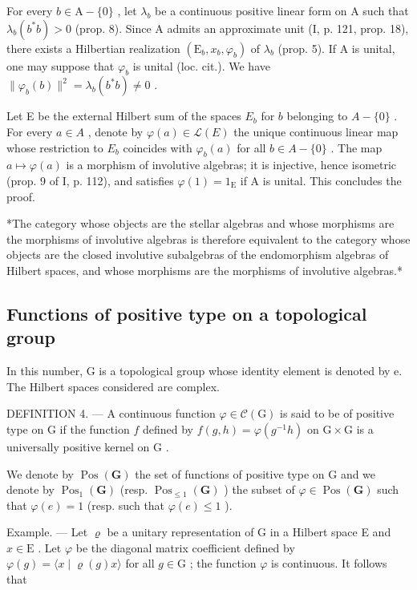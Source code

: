 For every \(b \in \mathrm{A} - \{0\}\) , let \(\lambda_b\) be a continuous positive linear form on A such that \(\lambda_b(b^*b) > 0\) (prop. 8). Since A admits an approximate unit (I, p. 121, prop. 18), there exists a Hilbertian realization \((\mathrm{E}_b, x_b, \varphi_b)\) of \(\lambda_b\) (prop. 5). If A is unital, one may suppose that \(\varphi_b\) is unital (loc. cit.). We have \(\| \varphi_b(b) \|^2 = \lambda_b(b^*b) \neq 0\) .

Let E be the external Hilbert sum of the spaces \(E_{b}\) for \(b\) belonging to \(A - \{0\}\) . For every \(a \in A\) , denote by \(\varphi(a) \in \mathcal{L}(E)\) the unique continuous linear map whose restriction to \(E_{b}\) coincides with \(\varphi_{b}(a)\) for all \(b \in A - \{0\}\) . The map \(a \mapsto \varphi(a)\) is a morphism of involutive algebras; it is injective, hence isometric (prop. 9 of I, p. 112), and satisfies \(\varphi(1) = 1_{\mathrm{E}}\) if A is unital. This concludes the proof.

*The category whose objects are the stellar algebras and whose morphisms are the morphisms of involutive algebras is therefore equivalent to the category whose objects are the closed involutive subalgebras of the endomorphism algebras of Hilbert spaces, and whose morphisms are the morphisms of involutive algebras.*

\subsection{Functions of positive type on a topological group}

In this number, G is a topological group whose identity element is denoted by e. The Hilbert spaces considered are complex.

DEFINITION 4. --- A continuous function \(\varphi\in\mathcal{C}(\mathrm{G})\) is said to be of positive type on G if the function \(f\) defined by \(f(g,h)=\varphi(g^{-1}h)\) on \(\mathrm{G}\times\mathrm{G}\) is a universally positive kernel on \(\mathrm{G}\) .

We denote by \(\operatorname{Pos}(\mathbf{G})\) the set of functions of positive type on G and we denote by \(\operatorname{Pos}_{1}(\mathbf{G})\) (resp. \(\operatorname{Pos}_{\leqslant1}(\mathbf{G})\) ) the subset of \(\varphi\in\operatorname{Pos}(\mathbf{G})\) such that \(\varphi(e)=1\) (resp. such that \(\varphi(e)\leqslant1\) ).

Example. --- Let \(\varrho\) be a unitary representation of G in a Hilbert space E and \(x \in \mathrm{E}\) . Let \(\varphi\) be the diagonal matrix coefficient defined by \(\varphi(g) = \langle x \mid \varrho(g)x \rangle\) for all \(g \in \mathrm{G}\) ; the function \(\varphi\) is continuous. It follows that

